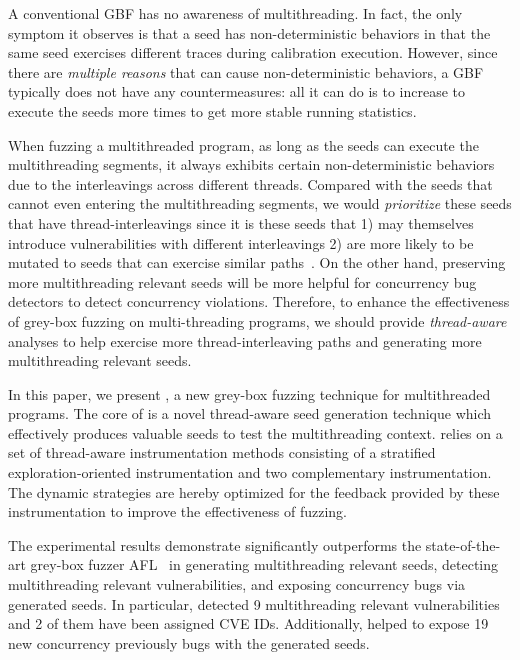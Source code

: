 A conventional GBF has no awareness of multithreading.
In fact, the only symptom it observes is that a seed has non-deterministic behaviors in that the same seed exercises different traces during calibration execution.
However, since there are \emph{multiple reasons} that can cause non-deterministic behaviors, a GBF typically does not have any countermeasures: all it can do is to increase \Ncal to execute the seeds more times to get more stable running statistics.

When fuzzing a multithreaded program, as long as the seeds can execute the multithreading segments, it always exhibits certain non-deterministic behaviors due to the interleavings across different threads. Compared with the seeds that cannot even entering the multithreading segments, we would \emph{prioritize} these seeds that have thread-interleavings since it is these seeds that 1) may themselves introduce vulnerabilities with different interleavings 2) are more likely to be mutated to seeds that can exercise similar paths~\cite{fuzz_survey}. On the other hand, preserving more multithreading relevant seeds will be more helpful for concurrency bug detectors to detect concurrency violations. Therefore, to enhance the effectiveness of grey-box fuzzing on multi-threading programs, we should provide \emph{thread-aware} analyses to help exercise more thread-interleaving paths and generating more multithreading relevant seeds.


In this paper, we present \mtfuzz, a new grey-box fuzzing technique for multithreaded programs.
The core of \mtfuzz is a novel thread-aware seed generation technique which
effectively produces valuable seeds to test the multithreading context. 
\mtfuzz relies on a set of thread-aware instrumentation methods consisting of a
stratified exploration-oriented instrumentation and two complementary instrumentation. The dynamic strategies are hereby optimized for the feedback provided by these instrumentation to improve the effectiveness of fuzzing.

The experimental results demonstrate \mtfuzz significantly outperforms the state-of-the-art grey-box fuzzer AFL~\cite{afl} in generating multithreading relevant seeds, detecting multithreading relevant vulnerabilities, and exposing concurrency bugs via generated seeds. In particular, \mtfuzz detected 9 multithreading relevant vulnerabilities and 2 of them have been assigned CVE IDs. Additionally, \mtfuzz helped to expose 19 new concurrency previously bugs with the generated seeds. 

